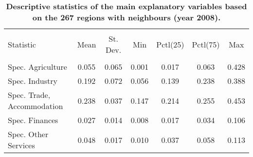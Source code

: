 \documentclass[11pt]{article}
\begin{document}
\begin{table}[!htbp] \centering 
  \caption{\textbf{Descriptive statistics of the main explanatory variables based on the 267 regions with neighbours (year 2008).}} 
  \label{descriptive_vars_filtered} 
\begin{tabular}{@{\extracolsep{5pt}}lcccccc} 
\\[-1.8ex]\hline 
\hline \\[-1.8ex] 
Statistic  & \multicolumn{1}{c}{Mean} & \multicolumn{1}{c}{St. Dev.} & \multicolumn{1}{c}{Min} & \multicolumn{1}{c}{Pctl(25)} & \multicolumn{1}{c}{Pctl(75)} & \multicolumn{1}{c}{Max} \\ 
\hline \\[-1.8ex] 
Spec. Agriculture & 0.055 & 0.065 & 0.001 & 0.017 & 0.063 & 0.428 \\ 
Spec. Industry  & 0.192 & 0.072 & 0.056 & 0.139 & 0.238 & 0.388 \\ 
Spec. Trade, Accommodation  & 0.238 & 0.037 & 0.147 & 0.214 & 0.255 & 0.453 \\ 
Spec. Finances  & 0.027 & 0.014 & 0.008 & 0.017 & 0.034 & 0.106 \\ 
Spec. Other Services & 0.048 & 0.017 & 0.010 & 0.037 & 0.058 & 0.113 \\ 

\end{tabular}
\end{table}
\end{document}
